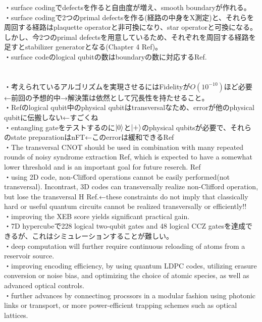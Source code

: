 \documentclass[a4paper,10.5pt]{ltjsarticle}
\begin{document}
・surface codingでdefectsを作ると自由度が増え、smooth boundaryが作れる。\\
・surface codingで2つのprimal defectsを作る(経路の中身をX測定)と、それらを周回する経路はplaquette operatorと非可換になり、star operatorと可換になる。しかし、今2つのprimal defectsを用意しているため、それぞれを周回する経路を足すとstabilizer generatorとなる(Chapter 4 Ref\cite{4})。\\
・surface codeのlogical qubitの数はboundaryの数に対応するRef\cite{5}.\\
\\
\\
・考えられているアルゴリズムを実現させるにはFidelityが$O(10^{-10})$ほど必要←前回の予想的中→解決策は依然として冗長性を持たせること。\\
・Ref\cite{1}のlogical qubit中のphysical qubitはtransversalなため、errorが他のphysical qubitに伝搬しない←すごくね\\
・entangling gateをテストするのに$\ket{0}$と$\ket{+}$のphysical qubitsが必要で、それらのstate preparationはnFT←このerrorは緩和できるRef\cite{1}\\
・The transversal CNOT should be used in combination with many repeated rounds of noisy syndrome extraction Ref\cite{2}, which is expected to have a somewhat lower threshold and is an important goal for future reserch. Ref\cite{1}\\
・using 2D code, non-Clifford operations cannot be easily performed(not transversal). Incontrast, 3D codes can transversally realize non-Clifford operation, but lose the transversal H Ref\cite{3}.←these constraints do not imply that classically hard or useful quantum circuits cannot be realized transversally or efficiently!!\\
・improving the XEB score yields significant practical gain.\\
・7D hypercubeで228 logical two-qubit gates and 48 logical CCZ gatesを達成できるが、これはシミュレーションすることが難しい。\\
・deep computation will further require continuous reloading of atoms from a reservoir source.\\
・improving encoding efficiency, by using quantum LDPC codes, utilizing erasure conversion or noise bias, and optimizing the choice of atomic species, as well as advanced optical controls.\\
・further advances by connectinog procssors in a modular fashion using photonic links or transport, or more power-efficient trapping schemes such as optical lattices.\\
\end{document}

